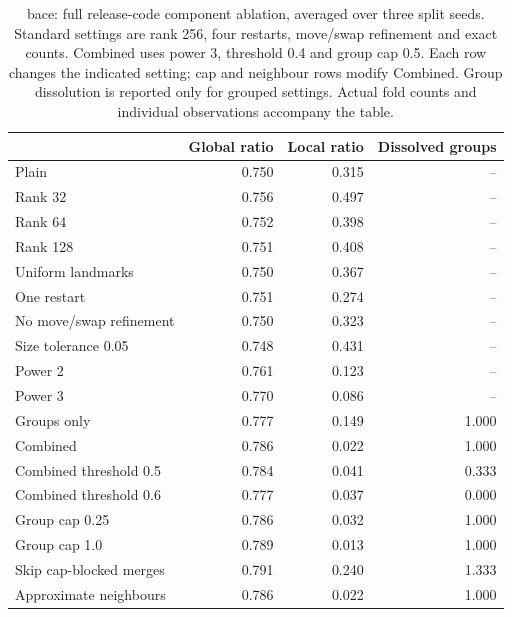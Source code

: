 \begin{table}[htbp]\centering\small
\begin{tabular}{lrrr}
\toprule
 & Global ratio & Local ratio & Dissolved groups \\
\midrule
Plain & 0.750 & 0.315 & -- \\
Rank 32 & 0.756 & 0.497 & -- \\
Rank 64 & 0.752 & 0.398 & -- \\
Rank 128 & 0.751 & 0.408 & -- \\
Uniform landmarks & 0.750 & 0.367 & -- \\
One restart & 0.751 & 0.274 & -- \\
No move/swap refinement & 0.750 & 0.323 & -- \\
Size tolerance 0.05 & 0.748 & 0.431 & -- \\
Power 2 & 0.761 & 0.123 & -- \\
Power 3 & 0.770 & 0.086 & -- \\
Groups only & 0.777 & 0.149 & 1.000 \\
Combined & 0.786 & 0.022 & 1.000 \\
Combined threshold 0.5 & 0.784 & 0.041 & 0.333 \\
Combined threshold 0.6 & 0.777 & 0.037 & 0.000 \\
Group cap 0.25 & 0.786 & 0.032 & 1.000 \\
Group cap 1.0 & 0.789 & 0.013 & 1.000 \\
Skip cap-blocked merges & 0.791 & 0.240 & 1.333 \\
Approximate neighbours & 0.786 & 0.022 & 1.000 \\
\bottomrule
\end{tabular}

\caption{bace: full release-code component ablation, averaged over three split seeds. Standard settings are rank 256, four restarts, move/swap refinement and exact counts. Combined uses power 3, threshold 0.4 and group cap 0.5. Each row changes the indicated setting; cap and neighbour rows modify Combined. Group dissolution is reported only for grouped settings. Actual fold counts and individual observations accompany the table.}\end{table}
